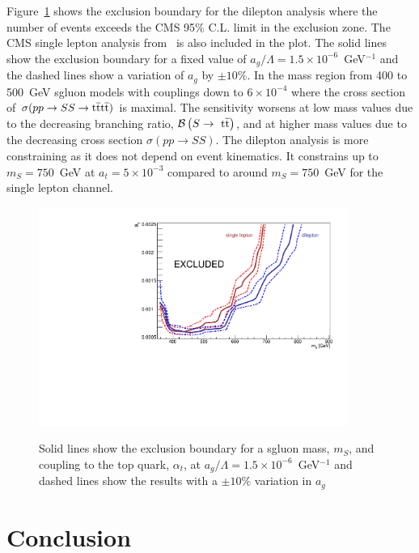 Figure~\ref{fig:sgluonExclusion} shows the exclusion boundary for the dilepton analysis where the number of events exceeds the CMS 95$\%$ C.L. limit in the exclusion zone. The CMS single lepton analysis from~\cite{Chatrchyan:2013fea,Beck201548} is also included in the plot. The solid lines show the exclusion boundary for a fixed value of $a_{g}/\Lambda = 1.5 \times 10^{-6}$~GeV$^{-1}$ and the dashed lines show a variation of $a_{g}$ by $\pm 10\%$. 
In the mass region from 400 to 500~GeV sgluon models with couplings down to $6\times10^{-4}$ where the cross section of $\sigma( pp \rightarrow SS \rightarrow \mathrm{t}\overline{\mathrm{t}}\mathrm{t}\overline{\mathrm{t}})$ is 
maximal. The sensitivity worsens at low mass values due to the decreasing branching ratio, $\mathcal{B}\left(S\rightarrow~\mathrm{t}\overline{\mathrm{t}} \right)$, and at higher 
mass values due to the decreasing cross section $\sigma( pp \rightarrow SS)$.
The dilepton analysis is more constraining as it does not depend on event kinematics. It constrains up to $ m_{S} = 750$~GeV at $a_t=5\times10^{-3}$ compared to around $ m_{S} = 750$~GeV for the single lepton channel.

\begin{figure}[h!]
\centering
    \includegraphics[width=0.9\textwidth]{images/Pheno/exclusion_agVariations.pdf}\\
    \caption{Solid lines show the exclusion boundary for a sgluon mass, $m_{S}$, and coupling to the top quark, $\alpha_{t}$, at $a_{g}/\Lambda = 1.5 \times 10^{-6}$~GeV$^{-1}$ and dashed lines show the results with a $\pm 10 \%$ variation in $a_{g}$}
    \label{fig:sgluonExclusion}
\end{figure}

\section{Conclusion}


